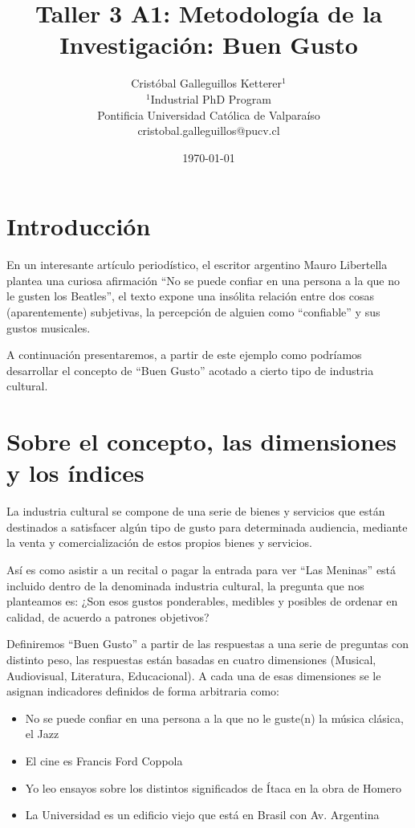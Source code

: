 \documentclass{article}
\title{Taller 3 A1: Metodología de la Investigación: Buen Gusto}
\author{Cristóbal Galleguillos Ketterer$^{1}$\\
\small{$^{1}$Industrial PhD Program}\\
\small{Pontificia Universidad Católica de Valparaíso}\\
\small{cristobal.galleguillos@pucv.cl}
}
\date{\small{\today}}
\begin{document}
\maketitle

\section{Introducción}

En un interesante artículo periodístico\cite{libertella_no_2020}, el escritor argentino Mauro Libertella plantea una curiosa afirmación “No se puede confiar en una persona a la que no le gusten los Beatles”,  el texto expone una insólita relación entre dos cosas (aparentemente) subjetivas, la percepción de alguien como “confiable” y sus gustos musicales.

A continuación presentaremos, a partir de este ejemplo como podríamos desarrollar el concepto de “Buen Gusto” acotado a cierto tipo de industria cultural.

\section{Sobre el concepto, las dimensiones y los índices}

La industria cultural \cite{ojeda_manifiesto_2019} se compone de una serie de bienes y servicios que están destinados a satisfacer algún tipo de gusto para determinada audiencia, mediante la venta y comercialización de estos propios bienes y servicios.

Así es como asistir a un recital o pagar la entrada para ver “Las Meninas” está incluido dentro de la denominada industria cultural, la pregunta que nos planteamos es: ¿Son esos gustos ponderables, medibles y posibles de ordenar en calidad, de acuerdo a patrones objetivos?

Definiremos “Buen Gusto” a partir de las respuestas a una serie de preguntas con distinto peso, las respuestas están basadas en cuatro dimensiones (Musical, Audiovisual, Literatura, Educacional). A cada una de esas dimensiones se le asignan indicadores definidos de forma arbitraria como:

\begin{itemize}
    \item No se puede confiar en una persona a la que no le guste(n) la música clásica, el Jazz
    \item El cine es Francis Ford Coppola
    \item Yo leo ensayos sobre los distintos significados de Ítaca en la obra de Homero
    \item La Universidad es un edificio viejo que está en Brasil con Av. Argentina
    
\end{itemize}
\end{document}

